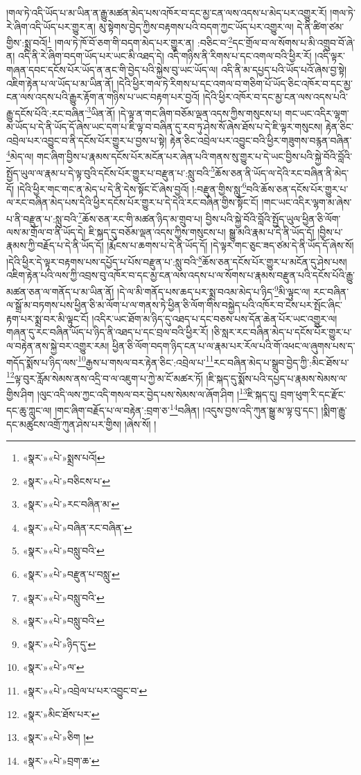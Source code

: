 །གལ་ཏེ་འདི་ཡོད་པ་མ་ཡིན་ན་རྒྱུ་མཚན་མེད་པས་འཁོར་བ་དང་མྱ་ངན་ལས་འདས་པ་མེད་པར་འགྱུར་རོ། །གལ་ཏེ་རེ་ཞིག་འདི་ཡོད་པར་གྱུར་ན། མུ་སྟེགས་བྱེད་ཀྱིས་བརྟགས་པའི་བདག་ཀྱང་ཡོད་པར་འགྱུར་ལ། དེ་ནི་ཚིག་ཙམ་གྱིས་:སྨྲ་བའོ།\footnote{«སྣར་»«པེ་»སྨྲས་པའོ།} །གལ་ཏེ་ཁོ་བོ་ཅག་གི་བདག་མེད་པར་གྱུར་ན། :བཅིང་བ་\footnote{«སྣར་»«པེ་»བཅིངས་པ་}དང་གྲོལ་བ་ལ་སོགས་པ་མི་འགྲུབ་བོ་ཞེ་ན། འདི་ནི་རེ་ཞིག་བདག་ཡོད་པར་ཡང་མི་འཐད་དེ། འདི་གཉིས་ནི་རིགས་པ་དང་འགལ་བའི་ཕྱིར་རོ། །འདི་ལྟར་གཞན་དབང་དངོས་པོར་ཡོད་ན་ནང་གི་བྱེད་པའི་སྐྱེས་བུ་ཡང་ཡོད་ལ། འདི་ནི་མ་དཔྱད་པའི་ཡོད་པའོ་ཞེས་བྱ་སྟེ། འཇིག་རྟེན་པ་ལ་ཡོད་པ་མ་ཡིན་ནོ། །དེའི་ཕྱིར་གལ་ཏེ་རིགས་པ་དང་འགལ་བ་གཅིག་པོ་ཡོད་ཅིང་འཁོར་བ་དང་མྱ་ངན་ལས་འདས་པའི་རྒྱུར་རྟོག་ན་གཉིས་པ་ཡང་བརྟག་པར་བྱའོ། །དེའི་ཕྱིར་འཁོར་བ་དང་མྱ་ངན་ལས་འདས་པའི་རྒྱུ་དངོས་པོའི་:རང་བཞིན་\footnote{«སྣར་»«པེ་»རང་བཞིན་མ་}ཡིན་ནོ། །དེ་ལྟ་ན་གང་ཞིག་བཅོམ་ལྡན་འདས་ཀྱིས་གསུངས་པ། གང་ཡང་འདིར་ལྷག་མ་ཡོད་པ་དེ་ནི་ཡོད་དོ་ཞེས་ཡང་དག་པ་ཇི་ལྟ་བ་བཞིན་དུ་རབ་ཏུ་ཤེས་སོ་ཞེས་ཐོས་པ་དེ་ཇི་ལྟར་གསུངས། རྟེན་ཅིང་འབྲེལ་པར་འབྱུང་བ་ནི་དངོས་པོར་གྱུར་པ་བྱས་པ་སྟེ། རྟེན་ཅིང་འབྲེལ་པར་འབྱུང་བའི་ཕྱིར་གཟུགས་བརྙན་བཞིན་\footnote{«སྣར་»«པེ་»བཞིན་རང་བཞིན་}མེད་ལ། གང་ཞིག་བྱིས་པ་རྣམས་དངོས་པོར་མངོན་པར་ཞེན་པའི་གནས་སུ་གྱུར་པ་དེ་ཡང་བྱིས་པའི་སྐྱེ་བོའི་བློའི་སྤྱོད་ཡུལ་ལ་རྣམ་པ་དེ་ལྟ་བུའི་དངོས་པོར་གྱུར་པ་བརྫུན་པ་:སླུ་བའི་\footnote{«སྣར་»«པེ་»བསླུ་བའི་}ཆོས་ཅན་ནི་ཡོད་ལ་དེའི་རང་བཞིན་ནི་མེད་དོ། །དེའི་ཕྱིར་གང་གང་ན་མེད་པ་དེ་ནི་དེས་སྟོང་ངོ་ཞེས་བྱའོ། །:བརྫུན་གྱིས་སླུ་\footnote{«སྣར་»«པེ་»བརྫུན་པ་བསླུ་}བའི་ཆོས་ཅན་དངོས་པོར་གྱུར་པ་ལ་རང་བཞིན་མེད་པས་དེའི་ཕྱིར་དངོས་པོར་གྱུར་པ་དེ་དེའི་རང་བཞིན་གྱིས་སྟོང་ངོ། །གང་ཡང་འདིར་ལྷག་མ་ཞེས་པ་ནི་བརྫུན་པ་:སླུ་བའི་\footnote{«སྣར་»«པེ་»བསླུ་བའི་}ཆོས་ཅན་རང་གི་མཚན་ཉིད་མ་གྲུབ་པ། བྱིས་པའི་སྐྱེ་བོའི་བློའི་སྤྱོད་ཡུལ་ཕྱིན་ཅི་ལོག་ལས་མ་གྲོལ་བ་ནི་ཡོད་དེ། ཇི་སྐད་དུ་བཅོམ་ལྡན་འདས་ཀྱིས་གསུངས་པ། སྒྱུ་མའི་རྣམ་པ་དེ་ནི་ཡོད་དོ། །བྱིས་པ་རྣམས་ཀྱི་བརྗོད་པ་དེ་ནི་ཡོད་དོ། །རྨོངས་པ་ཆགས་པ་དེ་ནི་ཡོད་དོ། །དེ་ལྟར་གང་ཅུང་ཟད་ཙམ་དེ་ནི་ཡོད་དོ་ཞེས་སོ། །དེའི་ཕྱིར་དེ་ལྟར་བརྟགས་པས་དཔྱོད་པ་པོས་བརྫུན་པ་:སླུ་བའི་\footnote{«སྣར་»«པེ་»བསླུ་བའི་}ཆོས་ཅན་དངོས་པོར་གྱུར་པ་མངོན་དུ་ཤེས་པས། འཇིག་རྟེན་པའི་ལས་ཀྱི་འབྲས་བུ་འཁོར་བ་དང་མྱ་ངན་ལས་འདས་པ་ལ་སོགས་པ་རྣམས་བརྫུན་པའི་དངོས་པོའི་རྒྱུ་མཚན་ཅན་ལ་གནོད་པ་མ་ཡིན་ནོ། །དེ་ལ་མི་གནོད་པས་ཆད་པར་སྨྲ་བའམ་མེད་པ་ཉིད་\footnote{«སྣར་»«པེ་»ཉིད་དུ་}མི་ལྟུང་ལ། རང་བཞིན་ལ་སྒྲོ་མ་བཏགས་པས་ཕྱིན་ཅི་མ་ལོག་པ་ལ་གནས་ཏེ་ཕྱིན་ཅི་ལོག་གིས་བསྐྱེད་པའི་འཁོར་བ་ངེས་པར་སྤོང་ཞིང་རྟག་པར་སྨྲ་བར་མི་ལྟུང་ངོ། །འདིར་ཡང་ཐོག་མ་ཉིད་དུ་འཐད་པ་དང་བཅས་པས་དོན་ཆེན་པོར་ཡང་འགྱུར་ལ། གཞན་དུ་རང་བཞིན་ཡོད་པ་ཉིད་ནི་འཐད་པ་དང་བྲལ་བའི་ཕྱིར་རོ། །ཅི་སླར་རང་བཞིན་མེད་པ་དངོས་པོར་གྱུར་པ་ལ་བརྟེན་ནས་སྐྱེ་བར་འགྱུར་རམ། ཕྱིན་ཅི་ལོག་བདག་ཉིད་ངན་པ་ལ་རྣམ་པར་རོལ་པའི་གོ་འཕང་ལ་ཞུགས་པས་ད་གདོད་སྨོས་པ་ཉིད་ལས་\footnote{«སྣར་»«པེ་»ལ་}རྒྱས་པ་གསལ་བར་རྟེན་ཅིང་:འབྲེལ་པ་\footnote{«སྣར་»«པེ་»འབྲེལ་པ་པར་འབྱུང་བ་}རང་བཞིན་མེད་པ་སྒྲུབ་བྱེད་ཀྱི་:མིང་ཐོས་པ་\footnote{«སྣར་»མིང་ཐོས་པར་}ལྟ་བུར་རློམ་སེམས་ནས་འདྲི་བ་ལ་འཇུག་པ་ཀྱེ་མ་ངོ་མཚར་ཏོ། །ཇི་སྐད་དུ་སྨོས་པའི་དཔྱད་པ་རྣམས་སེམས་ལ་གྱིས་ཤིག །ལུང་འདི་ལས་ཀྱང་འདི་གསལ་བར་བྱེད་པས་སེམས་ལ་ཞོག་ཤིག །\footnote{«སྣར་»«པེ་»ཅིག །}ཇི་སྐད་དུ། བྲག་ཕུག་རི་དང་རྫོང་དང་ཆུ་ཀླུང་ལ། །གང་ཞིག་བརྗོད་པ་ལ་བརྟེན་:བྲག་ཅ་\footnote{«སྣར་»«པེ་»བྲག་ཆ་}བཞིན། །འདུས་བྱས་འདི་ཀུན་སྒྱུ་མ་ལྟ་བུ་དང་། །སྨིག་རྒྱུ་དང་མཚུངས་འགྲོ་ཀུན་ཤེས་པར་གྱིས། །ཞེས་སོ། །
